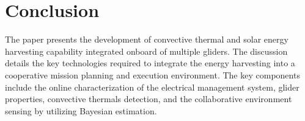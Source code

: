 \documentclass{ifacconf}
\newcommand{\squeezeup}{\vspace{-3.0mm}}
\begin{document}
\section{Conclusion}
\squeezeup
The paper presents the development of convective thermal and solar energy
harvesting capability integrated onboard of multiple gliders. The
discussion details the key technologies required to integrate the energy
harvesting into a cooperative mission planning and execution environment. The
key components include the online characterization of the electrical management system,
glider properties, convective thermals detection, and the collaborative environment sensing by utilizing Bayesian estimation.




\end{document}
